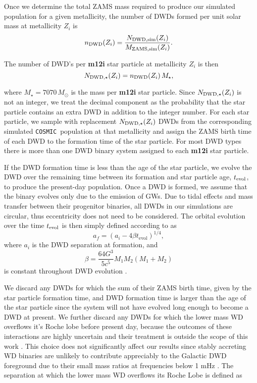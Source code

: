 \documentclass[twocolumn, linenumbers]{aastex631}
\newcommand{\cosmic}{\texttt{COSMIC}}
\begin{document}
Once we determine the total ZAMS mass required to produce our simulated 
population for a given metallicity, the number of DWDs formed per unit 
solar mass at metallicity $Z_i$ is
\begin{equation}
    n_{\rm{DWD}}(Z_i) = \frac{N_{\rm{DWD, sim}}(Z_i)}{M_{\rm{ZAMS, 
sim}}(Z_i)}.
\end{equation}

\noindent The number of DWD’s per \textbf{m12i} star particle at 
metallicity $Z_i$ is then
\begin{equation}
    N_{\rm{DWD},\star} (Z_i) = n_{\rm{DWD}}(Z_i)\, M_\star,
\end{equation}


\noindent where $M_\star = 7070\,M_\odot$ is the mass per \textbf{m12i} 
star particle. Since $N_{\rm{DWD},\star} (Z_i)$ is not an integer, we 
treat the decimal component as the probability that the star particle 
contains an extra DWD in addition to the integer number. For each star 
particle, we sample with replacement $N_{\rm{DWD},\star}(Z_i)$ DWDs from 
the corresponding simulated \cosmic\ population at that metallicity and 
assign the ZAMS birth time of each DWD to the formation time of the star 
particle. For most DWD types there is more than one DWD binary system 
assigned to each \textbf{m12i} star particle. 


If the DWD formation time is less than the age of the star particle, we 
evolve the DWD over the remaining time between its formation and star 
particle age, $t_{\rm{evol}}$, to produce the present-day population. Once 
a DWD is formed, we assume that the binary evolves only due to the 
emission of GWs. Due to tidal effects and mass transfer between their 
progenitor binaries, all DWDs in our simulations are circular, thus 
eccentricity does not need to be considered. The orbital evolution over 
the time $t_{\rm{evol}}$ is then simply defined according to 
\citet{Peters1964} as
\begin{equation}
    a_f = (a_i - 4\beta t_\text{evol})^{1/4},
\end{equation}
where $a_i$ is the DWD separation at formation, and 
\begin{equation}
    \beta = \frac{64G^3}{5c^5} M_1M_2(M_1+M_2)
\end{equation}
is constant throughout DWD evolution \citep{Peters1964}.

We discard any DWDs for which the sum of their ZAMS birth time, given by 
the star particle formation time, and DWD formation time is larger than 
the age of the star particle since the system will not have evolved long 
enough to become a DWD at present. We further discard any DWDs for which 
the lower mass WD overflows it's Roche lobe before present day, because 
the outcomes of these interactions are highly uncertain and their 
treatment is outside the scope of this work \citep[e.g., ][]{Shen2015, 
Kremer2017}. This choice does not significantly affect our results since 
stably accreting WD binaries are unlikely to contribute appreciably to the 
Galactic DWD foreground due to their small mass ratios at frequencies 
below 1 mHz \citep{Breivik2018}. The separation at which the lower mass WD 
overflows its Roche Lobe is defined as
\end{document}
